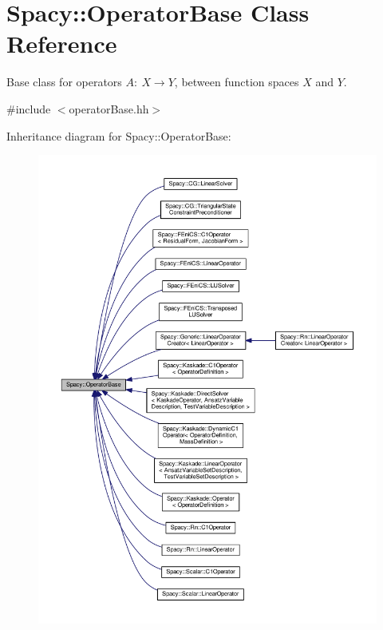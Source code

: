 \hypertarget{classSpacy_1_1OperatorBase}{}\section{Spacy\+:\+:Operator\+Base Class Reference}
\label{classSpacy_1_1OperatorBase}


Base class for operators $A:\ X\rightarrow Y$, between function spaces $X$ and $Y$.  




{\ttfamily \#include $<$operator\+Base.\+hh$>$}



Inheritance diagram for Spacy\+:\+:Operator\+Base\+:
\nopagebreak
\begin{figure}[H]
\begin{center}
\leavevmode
\includegraphics[width=350pt]{classSpacy_1_1OperatorBase__inherit__graph}
\end{center}
\end{figure}
